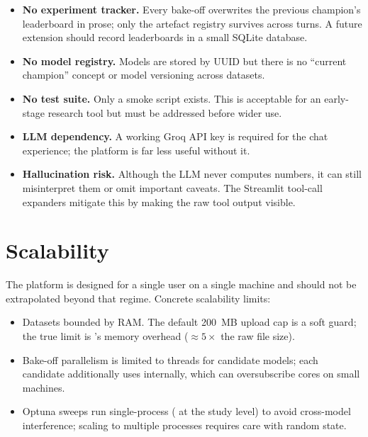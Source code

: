 \begin{itemize}[leftmargin=1.4em]
  \item \textbf{No experiment tracker.} Every bake-off overwrites
        the previous champion's leaderboard in prose; only the
        artefact registry survives across turns. A future extension
        should record leaderboards in a small SQLite database.
  \item \textbf{No model registry.} Models are stored by UUID but
        there is no ``current champion'' concept or model versioning
        across datasets.
  \item \textbf{No test suite.} Only a smoke script exists. This is
        acceptable for an early-stage research tool but must be
        addressed before wider use.
  \item \textbf{LLM dependency.} A working Groq API key is required
        for the chat experience; the platform is far less useful
        without it.
  \item \textbf{Hallucination risk.} Although the LLM never
        computes numbers, it can still misinterpret them or omit
        important caveats. The Streamlit tool-call expanders
        mitigate this by making the raw tool output visible.
\end{itemize}

\section{Scalability}
\label{sec:scalability}

The platform is designed for a single user on a single machine and
should not be extrapolated beyond that regime. Concrete
scalability limits:

\begin{itemize}[leftmargin=1.4em]
  \item Datasets bounded by RAM. The default 200~MB upload cap is a
        soft guard; the true limit is
        's memory overhead ($\approx 5\times$
        the raw file size).
  \item Bake-off parallelism is limited to 
        threads for candidate models; each candidate additionally
        uses  internally, which can oversubscribe
        cores on small machines.
  \item Optuna sweeps run single-process ( at the
        study level) to avoid cross-model interference; scaling to
        multiple processes requires care with random state.
\end{itemize}

